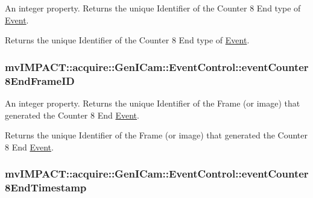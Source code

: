 An integer property. Returns the unique Identifier of the Counter 8 End type of \hyperlink{classmv_i_m_p_a_c_t_1_1acquire_1_1_event}{Event}. 

Returns the unique Identifier of the Counter 8 End type of \hyperlink{classmv_i_m_p_a_c_t_1_1acquire_1_1_event}{Event}. \hypertarget{classmv_i_m_p_a_c_t_1_1acquire_1_1_gen_i_cam_1_1_event_control_a6f0d45ee2b13509a6139f58811cfc0a4}{
\subsubsection[{event\+Counter8\+End\+Frame\+I\+D}]{ mv\+I\+M\+P\+A\+C\+T\+::acquire\+::\+Gen\+I\+Cam\+::\+Event\+Control\+::event\+Counter8\+End\+Frame\+I\+D}}\label{classmv_i_m_p_a_c_t_1_1acquire_1_1_gen_i_cam_1_1_event_control_a6f0d45ee2b13509a6139f58811cfc0a4}


An integer property. Returns the unique Identifier of the Frame (or image) that generated the Counter 8 End \hyperlink{classmv_i_m_p_a_c_t_1_1acquire_1_1_event}{Event}. 

Returns the unique Identifier of the Frame (or image) that generated the Counter 8 End \hyperlink{classmv_i_m_p_a_c_t_1_1acquire_1_1_event}{Event}. \hypertarget{classmv_i_m_p_a_c_t_1_1acquire_1_1_gen_i_cam_1_1_event_control_a42fa05f925298921b24c511d8259ec03}{
\subsubsection[{event\+Counter8\+End\+Timestamp}]{ mv\+I\+M\+P\+A\+C\+T\+::acquire\+::\+Gen\+I\+Cam\+::\+Event\+Control\+::event\+Counter8\+End\+Timestamp}}\label{classmv_i_m_p_a_c_t_1_1acquire_1_1_gen_i_cam_1_1_event_control_a42fa05f925298921b24c511d8259ec03}


